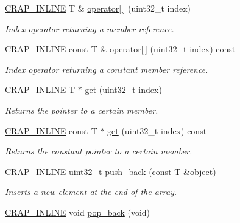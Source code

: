 \begin{DoxyCompactItemize}
\hyperlink{config__x86_8h_a5a40526b8d842e7ff731509998bb0f1c}{C\+R\+A\+P\+\_\+\+I\+N\+L\+I\+N\+E} T \& \hyperlink{classcrap_1_1array_a184cc666b60394822d131bb9676937ff}{operator\mbox{[}$\,$\mbox{]}} (uint32\+\_\+t index)
\begin{DoxyCompactList}\small\item\em Index operator returning a member reference. \end{DoxyCompactList}\item 
\hyperlink{config__x86_8h_a5a40526b8d842e7ff731509998bb0f1c}{C\+R\+A\+P\+\_\+\+I\+N\+L\+I\+N\+E} const T \& \hyperlink{classcrap_1_1array_a8f84b6feb0886aef202a86fc0ba5a862}{operator\mbox{[}$\,$\mbox{]}} (uint32\+\_\+t index) const 
\begin{DoxyCompactList}\small\item\em Index operator returning a constant member reference. \end{DoxyCompactList}\item 
\hyperlink{config__x86_8h_a5a40526b8d842e7ff731509998bb0f1c}{C\+R\+A\+P\+\_\+\+I\+N\+L\+I\+N\+E} T $\ast$ \hyperlink{classcrap_1_1array_a3daa9f7c2dfc0ea529507d8e1bed4def}{get} (uint32\+\_\+t index)
\begin{DoxyCompactList}\small\item\em Returns the pointer to a certain member. \end{DoxyCompactList}\item 
\hyperlink{config__x86_8h_a5a40526b8d842e7ff731509998bb0f1c}{C\+R\+A\+P\+\_\+\+I\+N\+L\+I\+N\+E} const T $\ast$ \hyperlink{classcrap_1_1array_a6b201791b042e2c4bdb5465741d77af6}{get} (uint32\+\_\+t index) const 
\begin{DoxyCompactList}\small\item\em Returns the constant pointer to a certain member. \end{DoxyCompactList}\item 
\hyperlink{config__x86_8h_a5a40526b8d842e7ff731509998bb0f1c}{C\+R\+A\+P\+\_\+\+I\+N\+L\+I\+N\+E} uint32\+\_\+t \hyperlink{classcrap_1_1array_afcc64517e2b719d1257eb8a4ed1a7eb9}{push\+\_\+back} (const T \&object)
\begin{DoxyCompactList}\small\item\em Inserts a new element at the end of the array. \end{DoxyCompactList}\item 
\hyperlink{config__x86_8h_a5a40526b8d842e7ff731509998bb0f1c}{C\+R\+A\+P\+\_\+\+I\+N\+L\+I\+N\+E} void \hyperlink{classcrap_1_1array_ae6c230d288cfe5934c6ee1e76e72474c}{pop\+\_\+back} (void)

\end{DoxyCompactItemize}
